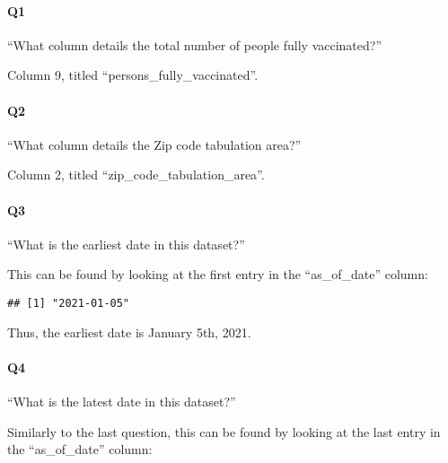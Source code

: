 \documentclass[
]{article}
\newenvironment{Shaded}{\begin{snugshade}}{\end{snugshade}}
\newcommand{\CommentTok}[1]{\textcolor[rgb]{0.56,0.35,0.01}{\textit{#1}}}
\newcommand{\DecValTok}[1]{\textcolor[rgb]{0.00,0.00,0.81}{#1}}
\newcommand{\FunctionTok}[1]{\textcolor[rgb]{0.00,0.00,0.00}{#1}}
\newcommand{\NormalTok}[1]{#1}
\newcommand{\SpecialCharTok}[1]{\textcolor[rgb]{0.00,0.00,0.00}{#1}}
\begin{document}
\hypertarget{q1}{%
\paragraph{Q1}\label{q1}}

``What column details the total number of people fully vaccinated?''

Column 9, titled ``persons\_fully\_vaccinated''.

\hypertarget{q2}{%
\paragraph{Q2}\label{q2}}

``What column details the Zip code tabulation area?''

Column 2, titled ``zip\_code\_tabulation\_area''.

\hypertarget{q3}{%
\paragraph{Q3}\label{q3}}

``What is the earliest date in this dataset?''

This can be found by looking at the first entry in the ``as\_of\_date''
column:

\begin{Shaded}
\end{Shaded}

\begin{verbatim}
## [1] "2021-01-05"
\end{verbatim}

Thus, the earliest date is January 5th, 2021.

\hypertarget{q4}{%
\paragraph{Q4}\label{q4}}

``What is the latest date in this dataset?''

Similarly to the last question, this can be found by looking at the last
entry in the ``as\_of\_date'' column:

\begin{Shaded}
\end{Shaded}
\end{document}
